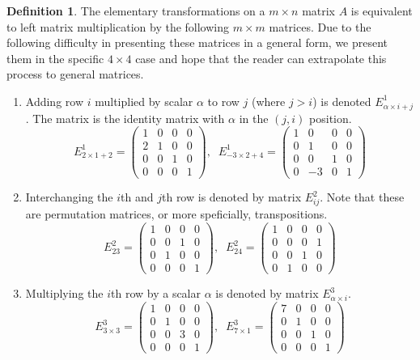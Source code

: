 \documentclass{article}
\theoremstyle{remark}
\theoremstyle{definition}
\newtheorem{definition}{Definition}[section]
\begin{document}
\begin{definition}
  The elementary transformations on a $m \times n$ matrix $A$ is equivalent to left matrix multiplication by the following $m \times m$ matrices. Due to the following difficulty in presenting these matrices in a general form, we present them in the specific $4 \times 4$ case and hope that the reader can extrapolate this process to general matrices. 
  \begin{enumerate}
    \item Adding row $i$ multiplied by scalar $\alpha$ to row $j$ (where $j > i$) is denoted $E^1_{\alpha \times i + j}$. The matrix is the identity matrix with $\alpha$ in the $(j, i)$ position. 
      \[E^1_{2 \times 1 + 2} = \begin{pmatrix}
      1&0&0&0 \\ 2&1&0&0 \\ 0&0&1&0 \\ 0&0&0&1
      \end{pmatrix}, \;\; E^1_{-3 \times 2 + 4} = \begin{pmatrix}
      1&0&0&0 \\ 0&1&0&0 \\ 0&0&1&0 \\ 0&-3&0&1
      \end{pmatrix}\]
    \item Interchanging the $i$th and $j$th row is denoted by matrix $E^2_{i j}$. Note that these are permutation matrices, or more speficially, transpositions. 
      \[ E^2_{2 3} = \begin{pmatrix}
      1&0&0&0 \\ 0&0&1&0 \\ 0&1&0&0 \\ 0&0&0&1
      \end{pmatrix}, \; \; E^2_{2 4} = \begin{pmatrix}
      1&0&0&0 \\ 0&0&0&1 \\ 0&0&1&0 \\ 0&1&0&0
      \end{pmatrix}\]
    \item Multiplying the $i$th row by a scalar $\alpha$ is denoted by matrix $E^3_{\alpha \times i}$. 
      \[ E^3_{3 \times 3} = \begin{pmatrix}
      1&0&0&0 \\ 0&1&0&0 \\ 0&0&3&0 \\ 0&0&0&1
      \end{pmatrix}, \;\; E^3_{7 \times 1} = \begin{pmatrix}
      7&0&0&0 \\ 0&1&0&0 \\ 0&0&1&0 \\ 0&0&0&1
      \end{pmatrix}\]
  \end{enumerate}
\end{definition}
\end{document}
